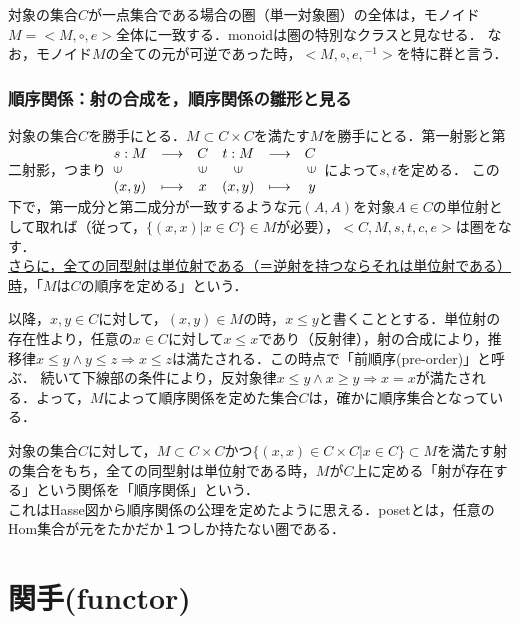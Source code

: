 \documentclass[uplatex, 12pt, a4paper, dvipdfmx]{jsarticle}
\begin{document}
\begin{screen}
    対象の集合$C$が一点集合である場合の圏（単一対象圏）の全体は，モノイド$M=<M,\circ,e>$全体に一致する．monoidは圏の特別なクラスと見なせる．
    なお，モノイド$M$の全ての元が可逆であった時，$<M,\circ,e,{}^{-1}>$を特に群と言う．
\end{screen}

\subsubsection{順序関係：射の合成を，順序関係の雛形と見る}

対象の集合$C$を勝手にとる．$M\subset C\times C$を満たす$M$を勝手にとる．第一射影と第二射影，つまり$\begin{array}{llccrr} s:M & \longrightarrow & C & t:M & \longrightarrow & C \\ \rotatebox{90}{$\in$} & & \rotatebox{90}{$\in$} & \rotatebox{90}{$\in$}& & \rotatebox{90}{$\in$}\\ (x,y) & \longmapsto & x & (x,y) & \longmapsto & y \end{array}$によって$s,t$を定める．
この下で，第一成分と第二成分が一致するような元$(A,A)$を対象$A\in C$の単位射として取れば（従って，$\{ (x,x) | x\in C \}\in M$が必要），$<C,M,s,t,c,e>$は圏をなす．\\
\underline{さらに，全ての同型射は単位射である（＝逆射を持つならそれは単位射である）時}，「$M$は$C$の順序を定める」という．\par

以降，$x,y\in C$に対して，$(x,y)\in M$の時，$x\le y$と書くこととする．単位射の存在性より，任意の$x\in C$に対して$x\le x$であり（反射律），射の合成により，推移律$x\le y \wedge y\le z \Longrightarrow x\le z$は満たされる．この時点で「前順序(pre-order)」と呼ぶ．
続いて下線部の条件により，反対象律$x\le y \wedge x\ge y \Longrightarrow x=x$が満たされる．よって，$M$によって順序関係を定めた集合$C$は，確かに順序集合となっている．

\begin{screen}
    対象の集合$C$に対して，$M\subset C\times C$かつ$\{ (x,x) \in C\times C | x\in C \}\subset M$を満たす射の集合をもち，全ての同型射は単位射である時，$M$が$C$上に定める「射が存在する」という関係を「順序関係」という．\\
    これはHasse図から順序関係の公理を定めたように思える．posetとは，任意のHom集合が元をたかだか１つしか持たない圏である．
\end{screen}

\clearpage
\section{関手(functor)}
\end{document}
